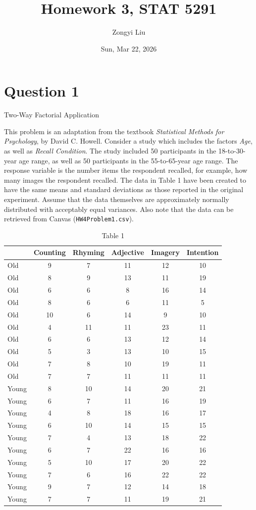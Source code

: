 \documentclass[letterpaper]{article}
\title{Homework 3, STAT 5291}
\author{Zongyi Liu}
\date{Sun, Mar 22, 2026}
\begin{document}
		\maketitle
		
		\section{Question 1}
		{\color{deepred}  Two-Way Factorial Application}
		
		This problem is an adaptation from the textbook \textit{Statistical Methods for Psychology}, by David C. Howell. Consider a study which includes the factors \textit{Age}, as well as \textit{Recall Condition}. The study included 50 participants in the 18-to-30-year age range, as well as 50 participants in the 55-to-65-year age range. The response variable is the number items the respondent recalled, for example, how many images the respondent recalled. The data in Table 1 have been created to have the same means and standard deviations as those reported in the original experiment. Assume that the data themselves are approximately normally distributed with acceptably equal variances. Also note that the data can be retrieved from Canvas (\texttt{HW4Problem1.csv}).
		
		\begin{table}[h]
			\centering
			\begin{tabular}{|l|ccccc|}
				\hline
				& Counting & Rhyming & Adjective & Imagery & Intention \\
				\hline
				Old & 9  & 7  & 11 & 12 & 10 \\
				Old & 8  & 9  & 13 & 11 & 19 \\
				Old & 6  & 6  & 8  & 16 & 14 \\
				Old & 8  & 6  & 6  & 11 & 5  \\
				Old & 10 & 6  & 14 & 9  & 10 \\
				Old & 4  & 11 & 11 & 23 & 11 \\
				Old & 6  & 6  & 13 & 12 & 14 \\
				Old & 5  & 3  & 13 & 10 & 15 \\
				Old & 7  & 8  & 10 & 19 & 11 \\
				Old & 7  & 7  & 11 & 11 & 11 \\
				\hline
				Young & 8  & 10 & 14 & 20 & 21 \\
				Young & 6  & 7  & 11 & 16 & 19 \\
				Young & 4  & 8  & 18 & 16 & 17 \\
				Young & 6  & 10 & 14 & 15 & 15 \\
				Young & 7  & 4  & 13 & 18 & 22 \\
				Young & 6  & 7  & 22 & 16 & 16 \\
				Young & 5  & 10 & 17 & 20 & 22 \\
				Young & 7  & 6  & 16 & 22 & 22 \\
				Young & 9  & 7  & 12 & 14 & 18 \\
				Young & 7  & 7  & 11 & 19 & 21 \\
				\hline
			\end{tabular}
			\caption{Table 1}
		\end{table}
	
\end{document}

